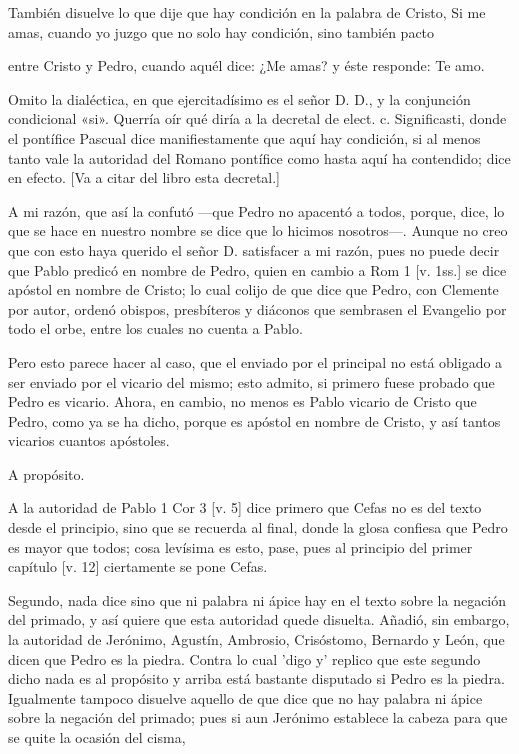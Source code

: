 También disuelve lo que dije que hay condición en la palabra de Cristo, Si me amas, cuando yo juzgo que no solo hay condición, sino también pacto

entre Cristo y Pedro, cuando aquél dice: ¿Me amas? y éste responde: Te amo.

Omito la dialéctica, en que ejercitadísimo es el señor D. D., y la conjunción condicional «si». Querría oír qué diría a la decretal de elect. c. Significasti, donde el pontífice Pascual dice manifiestamente que aquí hay condición, si al menos tanto vale la autoridad del Romano pontífice como hasta aquí ha contendido; dice en efecto. [Va a citar del libro esta decretal.]

A mi razón, que así la confutó —que Pedro no apacentó a todos, porque, dice, lo que se hace en nuestro nombre se dice que lo hicimos nosotros—. Aunque no creo que con esto haya querido el señor D. satisfacer a mi razón, pues no puede decir que Pablo predicó en nombre de Pedro, quien en cambio a Rom 1 [v. 1ss.] se dice apóstol en nombre de Cristo; lo cual colijo de que dice que Pedro, con Clemente por autor, ordenó obispos, presbíteros y diáconos que sembrasen el Evangelio por todo el orbe, entre los cuales no cuenta a Pablo.

Pero esto parece hacer al caso, que el enviado por el principal no está obligado a ser enviado por el vicario del mismo; esto admito, si primero fuese probado que Pedro es vicario. Ahora, en cambio, no menos es Pablo vicario de Cristo que Pedro, como ya se ha dicho, porque es apóstol en nombre de Cristo, y así tantos vicarios cuantos apóstoles.

A propósito.

A la autoridad de Pablo 1 Cor 3 [v. 5] dice primero que Cefas no es del texto desde el principio, sino que se recuerda al final, donde la glosa confiesa que Pedro es mayor que todos; cosa levísima es esto, pase, pues al principio del primer capítulo [v. 12] ciertamente se pone Cefas.

Segundo, nada dice sino que ni palabra ni ápice hay en el texto sobre la negación del primado, y así quiere que esta autoridad quede disuelta. Añadió, sin embargo, la autoridad de Jerónimo, Agustín, Ambrosio, Crisóstomo, Bernardo y León, que dicen que Pedro es la piedra. Contra lo cual 'digo y' replico que este segundo dicho nada es al propósito y arriba está bastante disputado si Pedro es la piedra. Igualmente tampoco disuelve aquello de que dice que no hay palabra ni ápice sobre la negación del primado; pues si aun Jerónimo establece la cabeza para que se quite la ocasión del cisma,

